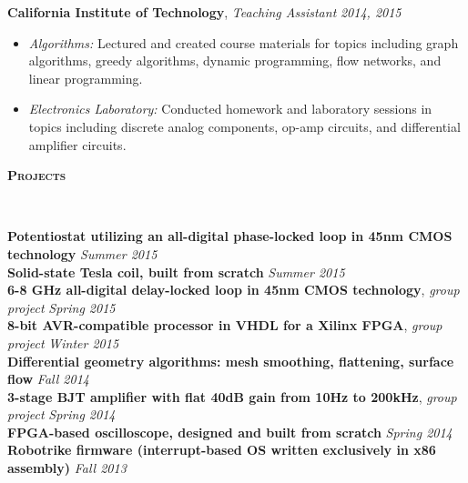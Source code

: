 \documentclass{article}
\newenvironment{changemargin}[2]{%
  \begin{list}{}{%
    \setlength{\topsep}{0pt}%
    \setlength{\leftmargin}{#1}%
    \setlength{\rightmargin}{#2}%
    \setlength{\listparindent}{\parindent}%
    \setlength{\itemindent}{\parindent}%
    \setlength{\parsep}{\parskip}%
  }%
  \item[]}{\end{list}
}
\newcommand{\lineover}{
	\begin{changemargin}{-0.05in}{-0.05in}
		\vspace*{-8pt}
		\hrulefill \\
		\vspace*{-2pt}
	\end{changemargin}
}
\newcommand{\header}[1]{
	\begin{changemargin}{-.5in}{-0.5in}
		{\large \textbf{\scshape{#1}}}\\
  	\lineover
	\end{changemargin}
}
\newenvironment{body} {
	\vspace*{-16pt}
	\begin{changemargin}{-0.25in}{-0.5in}
  }	
	{\end{changemargin}
}
\begin{document}
\begin{body}
	\smallskip

	\textbf{California Institute of Technology}, \emph{Teaching Assistant} \hfill \emph{2014, 2015} \\
	\vspace*{-4pt}
	\begin{itemize}
		\item \emph{Algorithms:} Lectured and created course materials for topics including graph algorithms, greedy algorithms, dynamic programming, flow networks, and linear programming.
		\item \emph{Electronics Laboratory:} Conducted homework and laboratory sessions in topics including discrete analog components, op-amp circuits, and differential amplifier circuits.
	\end{itemize}
\end{body}

\smallskip

\header{Projects}
\begin{body}
	\vspace{14pt}
	\textbf{Potentiostat utilizing an all-digital phase-locked loop in 45nm CMOS technology} \hfill \emph{Summer 2015}\\
	\textbf{Solid-state Tesla coil, built from scratch} \hfill \emph{Summer 2015} \\
	\textbf{6-8 GHz all-digital delay-locked loop in 45nm CMOS technology}, \emph{group project} \hfill \emph{Spring 2015}\\
	\textbf{8-bit AVR-compatible processor in VHDL for a Xilinx FPGA}, \emph{group project} \hfill \emph{Winter 2015}\\
	\textbf{Differential geometry algorithms: mesh smoothing, flattening, surface flow} \hfill \emph{Fall 2014}\\
	\textbf{3-stage BJT amplifier with flat 40dB gain from 10Hz to 200kHz}, \emph{group project} \hfill \emph{Spring 2014}\\
	\textbf{FPGA-based oscilloscope, designed and built from scratch} \hfill \emph{Spring 2014}\\
	\textbf{Robotrike firmware (interrupt-based OS written exclusively in x86 assembly)} \hfill \emph{Fall 2013}\\
\end{body}
\end{document}
